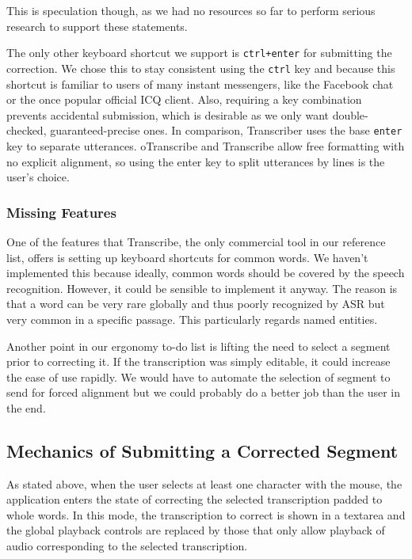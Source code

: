 \documentclass{svproc}
\begin{document}
This is speculation though, as we had no resources so far to perform serious
research to support these statements.

The only other keyboard shortcut we support is \texttt{ctrl+enter} for
submitting the correction. We chose this to stay consistent using the
\texttt{ctrl} key and because this shortcut is familiar to users of many instant
messengers, like the Facebook chat or the once popular official ICQ client.
Also, requiring a key combination prevents accidental submission, which is
desirable as we only want double-checked, guaranteed-precise ones. In
comparison, Transcriber uses the base \texttt{enter} key to separate utterances.
oTranscribe and Transcribe allow free formatting with no explicit alignment, so
using the enter key to split utterances by lines is the user's choice.

\subsubsection{Missing Features}

One of the features that Transcribe, the only commercial tool in our reference
list, offers is setting up keyboard shortcuts for common words. We haven't
implemented this because ideally, common words should be covered by the speech
recognition. However, it could be sensible to implement it anyway. The reason is
that a word can be very rare globally and thus poorly recognized by ASR but very
common in a specific passage. This particularly regards named entities.

Another point in our ergonomy to-do list is lifting the need to select a segment
prior to correcting it. If the transcription was simply editable, it could
increase the ease of use rapidly. We would have to automate the selection of
segment to send for forced alignment but we could probably do a better job than
the user in the end.

\subsection{Mechanics of Submitting a Corrected Segment}

As stated above, when the user selects at least one character with the mouse,
the application enters the state of correcting the selected transcription padded
to whole words. In this mode, the transcription to correct is shown in a
textarea and the global playback controls are replaced by those that only allow
playback of audio corresponding to the selected transcription.
\end{document}
